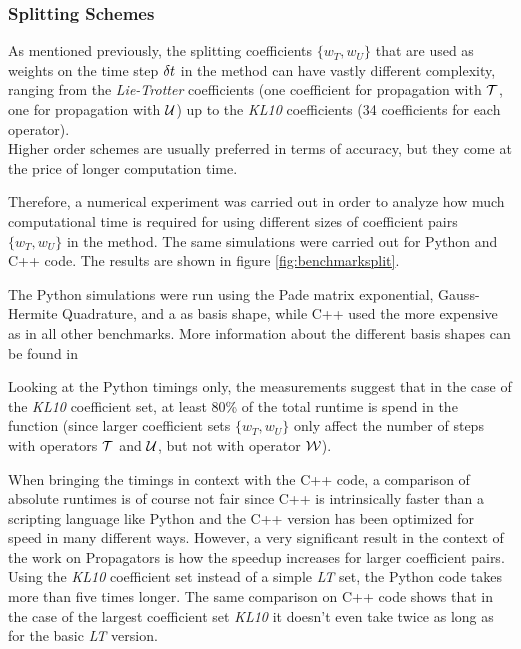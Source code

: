 \subsubsection{Splitting Schemes}
%
As mentioned previously, the splitting coefficients $\{ w_T, w_U \}$ that are used as weights on the time step $\delta t$ in the  method can have vastly different complexity, ranging from the \emph{Lie-Trotter} coefficients (one coefficient for propagation with $\mathcal{T}$, one for propagation with $\mathcal{U}$) up to the \emph{KL10} coefficients (34 coefficients for each operator). \\
Higher order schemes are usually preferred in terms of accuracy, but they come at the price of longer computation time.
\par\medskip
%
Therefore, a numerical experiment was carried out in order to analyze how much computational time is required for using different sizes of coefficient pairs $\{ w_T, w_U \}$ in the  method.
The same simulations were carried out for Python and C++ code.
The results are shown in figure \ref{fig:benchmarksplit}.
\par\medskip
%
The Python simulations were run using the Pade matrix exponential, Gauss-Hermite Quadrature, and a  as basis shape, while
C++ used the more expensive  as in all other benchmarks.
More information about the different basis shapes can be found in \cite{B_master_thesis}
\par\medskip
%
Looking at the Python timings only, the measurements suggest that in the case of the \emph{KL10} coefficient set, at least 80\% of the total runtime is spend in the  function (since larger coefficient sets $\{ w_T, w_U \}$ only affect the number of steps with operators $\mathcal{T}$ and $\mathcal{U}$, but not with operator $\mathcal{W}$).
\par\medskip
%
When bringing the timings in context with the C++ code, a comparison of absolute runtimes is of course not fair since C++ is intrinsically faster than a scripting language like Python and the C++ version has been optimized for speed in many different ways.
However, a very significant result in the context of the work on Propagators is how the speedup increases for larger coefficient pairs.
Using the \emph{KL10} coefficient set instead of a simple \emph{LT} set, the Python code takes more than five times longer.
The same comparison on C++ code shows that in the case of the largest coefficient set \emph{KL10} it doesn't even take twice as long as for the basic \emph{LT} version.
